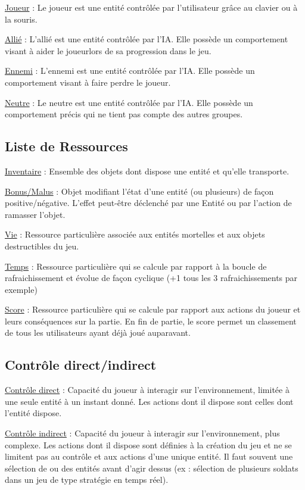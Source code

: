 \underline{Joueur} :
Le joueur est une entité contrôlée par l'utilisateur grâce au clavier ou à la souris.

\underline{Allié} :
L'allié est une entité contrôlée par l'IA. Elle possède un comportement visant à aider le joueurlors de sa progression dans le jeu.

\underline{Ennemi} :
L'ennemi est une entité contrôlée par l'IA. Elle possède un comportement visant à faire perdre le joueur.

\underline{Neutre} :
Le neutre est une entité contrôlée par l'IA. Elle possède un comportement précis qui ne tient pas compte des autres groupes.


\subsection*{Liste de Ressources}


\underline{Inventaire} : 
Ensemble des objets dont dispose une entité et qu'elle transporte.

\underline{Bonus/Malus} :
Objet modifiant l'état d'une entité (ou plusieurs) de façon positive/négative. L'effet peut-être déclenché par une Entité ou par l'action de ramasser l'objet.

\underline{Vie} : 
Ressource particulière associée aux entités mortelles et aux objets destructibles du jeu.

\underline{Temps} :
Ressource particulière qui se calcule par rapport à la boucle de rafraichissement et évolue de façon cyclique (+1 tous les 3 rafraichissements par exemple)

\underline{Score} :
Ressource particulière qui se calcule par rapport aux actions du joueur et leurs conséquences sur la partie.
En fin de partie, le score permet un classement de tous les utilisateurs ayant déjà joué auparavant.

\subsection*{Contrôle direct/indirect}

\underline{Contrôle direct} :
Capacité du joueur à interagir sur l’environnement, limitée à une seule entité à un instant donné. 
Les actions dont il dispose sont celles dont l'entité dispose.

\underline{Contrôle indirect} :
Capacité du joueur à interagir sur l’environnement, plus complexe. 
Les actions dont il dispose sont définies à la création du jeu et ne se limitent pas au contrôle et aux actions d'une unique entité.
Il faut souvent une sélection de ou des entités avant d'agir dessus (ex : sélection de plusieurs soldats dans un jeu de type stratégie en temps réel).

